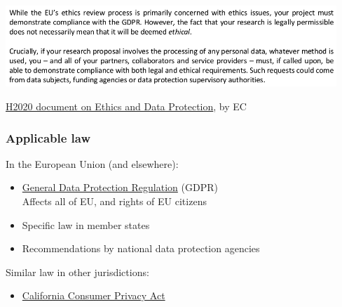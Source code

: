 \documentclass[17pt,aspectratio=169,hyperref={pdfusetitle,colorlinks,allcolors=olive}]{beamer}
\begin{document}
\begin{frame}[fragile]
  \begin{center}
    \includegraphics[width=12.5cm]{figs/legal-ethical}
  \end{center}
  {\footnotesize
    \begin{flushright}
    \href{https://ec.europa.eu/research/participants/data/ref/h2020/grants_manual/hi/ethics/h2020_hi_ethics-data-protection_en.pdf}{H2020 document on Ethics and Data Protection},  by EC
    \end{flushright}
  }
\end{frame}

\begin{frame}[fragile]
  \frametitle{Applicable law}

  In the European Union (and elsewhere):
  
  \begin{itemize}
  \item \href{https://gdpr.eu/}{General Data Protection Regulation} (GDPR) \\
    Affects all of EU, and rights of EU citizens
  \item Specific law in member states
  \item Recommendations by national data protection agencies \\
  \end{itemize}

  Similar law in other jurisdictions:

  \begin{itemize}
  \item \href{https://www.oag.ca.gov/privacy/ccpa}{California Consumer Privacy Act}
  \end{itemize}
\end{frame}
\end{document}
